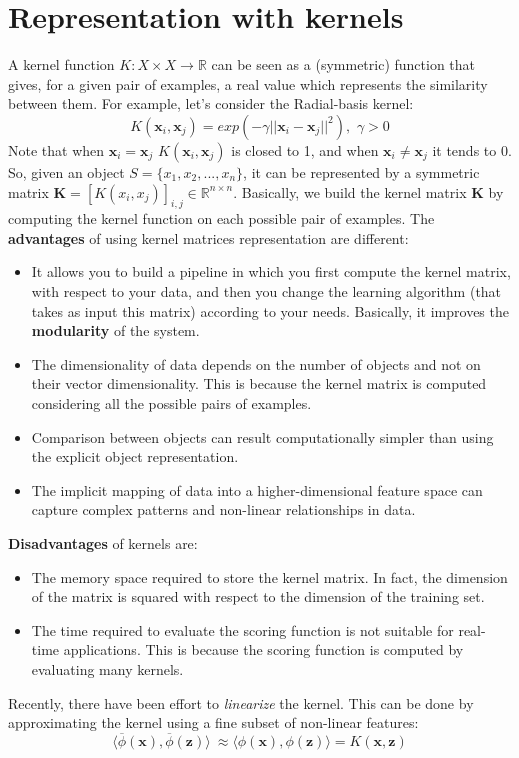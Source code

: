 \section{Representation with kernels}
A kernel function $K: X \times X \rightarrow \mathbb{R}$ can be seen as a (symmetric) function that gives, for a given pair of examples, a real value which represents the similarity between them. For example, let's consider the Radial-basis kernel:
\[K(\textbf{x}_{i},\textbf{x}_{j}) = exp(-\gamma ||\textbf{x}_{i} - \textbf{x}_{j}||^{2}),\,\, \gamma > 0\]
Note that when $\textbf{x}_{i} = \textbf{x}_{j}$ $K(\textbf{x}_{i},\textbf{x}_{j})$ is closed to 1, and when $\textbf{x}_{i} \neq \textbf{x}_{j}$ it tends to 0. So, given an object $S = \{x_{1}, x_{2},...,x_{n}\}$, it can be represented by a symmetric matrix $\textbf{K} = [K(x_{i}, x_{j})]_{i,j} \in \mathbb{R}^{n \times n}$. Basically, we build the kernel matrix $\textbf{K}$ by computing the kernel function on each possible pair of examples.\newline\newline
The \textbf{advantages} of using kernel matrices representation are different:
\begin{itemize}
    \item It allows you to build a pipeline in which you first compute the kernel matrix, with respect to your data, and then you change the learning algorithm (that takes as input this matrix) according to your needs. Basically, it improves the \textbf{modularity} of the system.

    \item The dimensionality of data depends on the number of objects and not on their vector dimensionality. This is because the kernel matrix is computed considering all the possible pairs of examples.

    \item Comparison between objects can result computationally simpler than using the explicit object representation.

    \item The implicit mapping of data into a higher-dimensional feature space can capture complex patterns and non-linear relationships in data.
\end{itemize}

\textbf{Disadvantages} of kernels are:
\begin{itemize}
    \item The memory space required to store the kernel matrix. In fact, the dimension of the matrix is squared with respect to the dimension of the training set.

    \item The time required to evaluate the scoring function is not suitable for real-time applications. This is because the scoring function is computed by evaluating many kernels.
\end{itemize}
Recently, there have been effort to \textit{linearize} the kernel. This can be done by approximating the kernel using a fine subset of non-linear features:
\[\langle \overline{\phi}(\textbf{x}), \overline{\phi}(\textbf{z}) \rangle\ \approx \langle \phi(\textbf{x}), \phi(\textbf{z}) \rangle = K(\textbf{x},\textbf{z})\]

